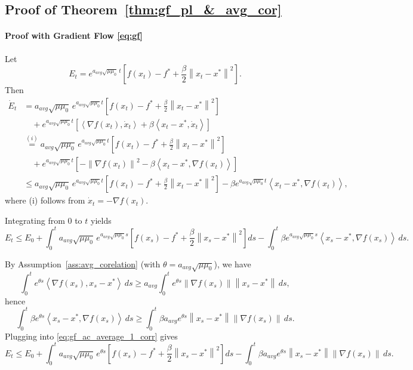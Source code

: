 \documentclass{article}
\newcommand{\norm}[1]{\left\lVert#1\right\rVert}
\newcommand{\dotprod}[1]{\left< #1\right>}
\theoremstyle{plain}
\theoremstyle{definition}
\theoremstyle{remark}
\begin{document}
  \subsection{Proof of Theorem~\ref{thm:gf_pl_&_avg_cor}}\label{app:gf_pl_&_avg_cor}
\paragraph{Proof with Gradient Flow \eqref{eq:gf}}

Let
\[
E_t = e^{a_{avg}\sqrt{\mu \mu_0}\, t}\left[f(x_t)-f^\ast + \frac{\beta}{2}\norm{x_t-x^\ast}^2 \right].
\]
Then
\begin{align*}
\dot E_t
&= a_{avg}\sqrt{\mu\mu_0}\,e^{a_{avg}\sqrt{\mu\mu_0}t}
\left[f(x_t)-f^\ast + \frac{\beta}{2}\norm{x_t-x^\ast}^2 \right]\\
&\quad + e^{a_{avg}\sqrt{\mu\mu_0}t}\left[\dotprod{\nabla f(x_t),\dot x_t}
+ \beta \dotprod{x_t-x^\ast,\dot x_t}\right]\\
&\overset{(i)}{=} a_{avg}\sqrt{\mu\mu_0}\,e^{a_{avg}\sqrt{\mu\mu_0}t}
\left[f(x_t)-f^\ast + \frac{\beta}{2}\norm{x_t-x^\ast}^2 \right]\\
&\quad + e^{a_{avg}\sqrt{\mu\mu_0}t}\left[-\norm{\nabla f(x_t)}^2
- \beta \dotprod{x_t-x^\ast,\nabla f(x_t)}\right]\\
&\le a_{avg}\sqrt{\mu\mu_0}\,e^{a_{avg}\sqrt{\mu\mu_0}t}
\left[f(x_t)-f^\ast + \frac{\beta}{2}\norm{x_t-x^\ast}^2 \right]
- \beta e^{a_{avg}\sqrt{\mu\mu_0}t}\dotprod{x_t-x^\ast,\nabla f(x_t)},
\end{align*}
where (i) follows from $\dot x_t=-\nabla f(x_t)$.

Integrating from $0$ to $t$ yields
\begin{equation}\label{eq:gf_ac_average_1_corr}
E_t \le E_0
+ \int_0^t a_{avg}\sqrt{\mu\mu_0}\,e^{a_{avg}\sqrt{\mu\mu_0}s}
\left[f(x_s)-f^\ast + \frac{\beta}{2}\norm{x_s-x^\ast}^2 \right]ds
- \int_0^t \beta e^{a_{avg}\sqrt{\mu\mu_0}s}\dotprod{x_s-x^\ast,\nabla f(x_s)}\,ds.
\end{equation}

By Assumption~\ref{ass:avg_corelation} (with $\theta=a_{avg}\sqrt{\mu\mu_0}$), we have
\[
\int_0^t e^{\theta s}\dotprod{\nabla f(x_s),x_s-x^\ast}\,ds
\ge a_{avg}\int_0^t e^{\theta s}\norm{\nabla f(x_s)}\norm{x_s-x^\ast}\,ds,
\]
hence
\[
\int_0^t \beta e^{\theta s}\dotprod{x_s-x^\ast,\nabla f(x_s)}\,ds
\ge
\int_0^t \beta a_{avg} e^{\theta s}\norm{x_s-x^\ast}\norm{\nabla f(x_s)}\,ds.
\]
Plugging into \eqref{eq:gf_ac_average_1_corr} gives
\begin{equation}\label{eq:gf_ac_average_2_corr}
E_t \le E_0
+ \int_0^t a_{avg}\sqrt{\mu\mu_0}\,e^{\theta s}
\left[f(x_s)-f^\ast + \frac{\beta}{2}\norm{x_s-x^\ast}^2 \right]ds
- \int_0^t \beta a_{avg} e^{\theta s}\norm{x_s-x^\ast}\norm{\nabla f(x_s)}\,ds.
\end{equation}
\end{document}
